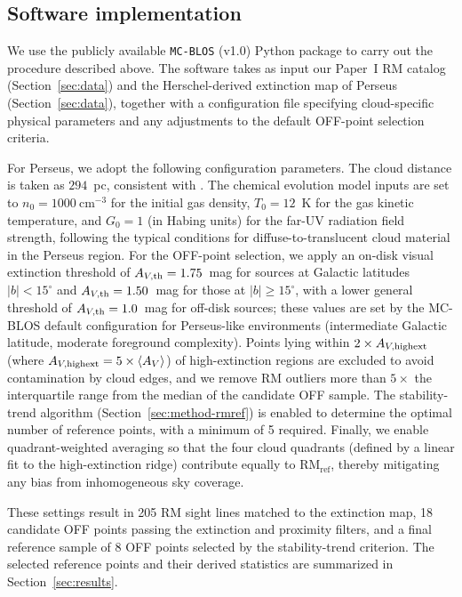 \documentclass[twocolumn]{aastex631}
\begin{document}
\subsection{Software implementation}
\label{sec:method-implementation}

We use the publicly available \texttt{MC-BLOS} (v1.0) Python package \citep{tahani2025mcblos} to carry out the procedure described above. The software takes as input our Paper~I RM catalog (Section~\ref{sec:data}) and the Herschel-derived extinction map of Perseus (Section~\ref{sec:data}), together with a configuration file specifying cloud-specific physical parameters and any adjustments to the default OFF-point selection criteria.

For Perseus, we adopt the following configuration parameters. The cloud distance is taken as $294$~pc, consistent with \citet{zucker2018}. The chemical evolution model inputs are set to $n_0 = 1000~\mathrm{cm^{-3}}$ for the initial gas density, $T_0 = 12$~K for the gas kinetic temperature, and $G_0 = 1$ (in Habing units) for the far-UV radiation field strength, following the typical conditions for diffuse-to-translucent cloud material in the Perseus region. For the OFF-point selection, we apply an on-disk visual extinction threshold of $A_{V,\rm th} = 1.75$~mag for sources at Galactic latitudes $|b| < 15^\circ$ and $A_{V,\rm th} = 1.50$~mag for those at $|b| \geq 15^\circ$, with a lower general threshold of $A_{V,\rm th} = 1.0$~mag for off-disk sources; these values are set by the MC-BLOS default configuration for Perseus-like environments (intermediate Galactic latitude, moderate foreground complexity). Points lying within $2 \times A_{V,\rm highext}$ (where $A_{V,\rm highext} = 5 \times \langle A_V \rangle$) of high-extinction regions are excluded to avoid contamination by cloud edges, and we remove RM outliers more than $5\times$ the interquartile range from the median of the candidate OFF sample. The stability-trend algorithm (Section~\ref{sec:method-rmref}) is enabled to determine the optimal number of reference points, with a minimum of 5 required. Finally, we enable quadrant-weighted averaging so that the four cloud quadrants (defined by a linear fit to the high-extinction ridge) contribute equally to $\mathrm{RM_{ref}}$, thereby mitigating any bias from inhomogeneous sky coverage.

These settings result in 205 RM sight lines matched to the extinction map, 18 candidate OFF points passing the extinction and proximity filters, and a final reference sample of 8 OFF points selected by the stability-trend criterion. The selected reference points and their derived statistics are summarized in Section~\ref{sec:results}.
\end{document}

